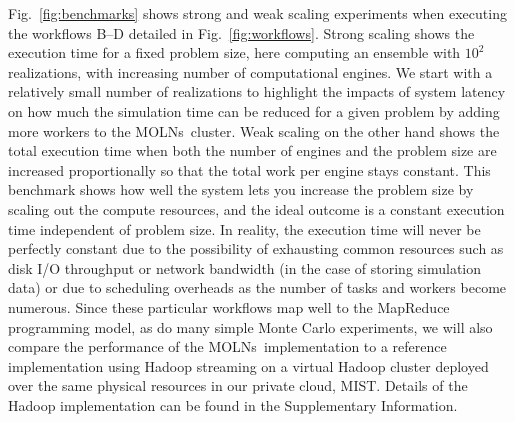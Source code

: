 \documentclass[final,leqno,onefignum,onetabnum]{siamltex1213}
\def\packagename {MOLNs}
\begin{document}
Fig.~\ref{fig:benchmarks} shows strong and weak scaling experiments when executing the workflows B--D detailed in Fig.~\ref{fig:workflows}. Strong scaling shows the execution time for a fixed problem size, here computing an ensemble with $10^2$ realizations, with increasing number of computational engines. We start with a relatively small number of realizations to highlight the impacts of system latency on how much the simulation time can be reduced for a given problem by adding more workers to the \packagename~cluster. Weak scaling on the other hand shows the total execution time when both the number of engines and the problem size are increased proportionally so that the total work per engine stays constant. This benchmark shows how well the system lets you increase the problem size by scaling out the compute resources, and the ideal outcome is a constant execution time independent of problem size. In reality, the execution time will never be perfectly constant due to the possibility of exhausting common resources such as disk I/O throughput or network bandwidth (in the case of storing simulation data) or due to scheduling overheads as the number of tasks and workers become numerous. Since these particular workflows map well to the MapReduce programming model, as do many simple Monte Carlo experiments, we will also compare the performance of the \packagename~implementation to a reference implementation using Hadoop streaming on a virtual Hadoop cluster deployed over the same physical resources in our private cloud, MIST.  Details of the Hadoop implementation can be found in the Supplementary Information. 
\end{document}
